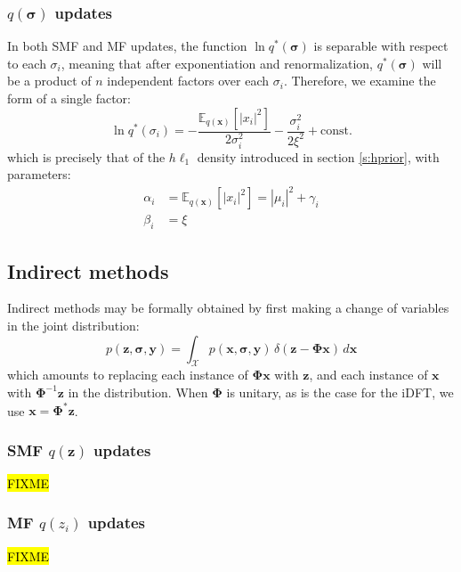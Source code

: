 \documentclass{article}
\newcommand{\m}[1]{\boldsymbol{#1}}
\newcommand{\E}[2]{\mathbb{E}_{#2}\left[ #1 \right]}
\begin{document}
\subsubsection{$q(\m{\sigma})$ updates}
In both SMF and MF updates, the function $\ln q^*(\m{\sigma})$ is separable
with respect to each $\sigma_i$, meaning that after exponentiation and
renormalization, $q^*(\m{\sigma})$ will be a product of $n$ independent
factors over each $\sigma_i$. Therefore, we examine the form of a
single factor:
\begin{equation*}
\ln q^*(\sigma_i) =
 -\frac{\E{|x_i|^2}{q(\m{x})}}{2 \sigma_i^2}
 -\frac{\sigma_i^2}{2 \xi^2}
 +\text{const.}
\end{equation*}
which is precisely that of the $h\ell_1$ density introduced in section
\ref{s:hprior}, with parameters:
\begin{equation*}
\begin{aligned}
\alpha_i &= \E{|x_i|^2}{q(\m{x})} = |\mu_i|^2 + \gamma_i
\\
\beta_i &= \xi
\end{aligned}
\end{equation*}

\subsection{Indirect methods}
\label{ss:var_indirect}
Indirect methods may be formally obtained by first making a change of
variables in the joint distribution:
\begin{equation}
p(\m{z}, \m{\sigma}, \m{y}) = \int_{\mathcal{X}}
 p(\m{x}, \m{\sigma}, \m{y}) \, \delta(\m{z} - \m{\Phi} \m{x}) \, d\m{x}
\label{eq:x_to_z}
\end{equation}
which amounts to replacing each instance of $\m{\Phi} \m{x}$ with $\m{z}$,
and each instance of $\m{x}$ with $\m{\Phi}^{-1} \m{z}$ in the distribution.
When $\m{\Phi}$ is unitary, as is the case for the iDFT, we use
$\m{x} = \m{\Phi}^* \m{z}$.

\subsubsection{SMF $q(\m{z})$ updates}
\hl{FIXME}

\subsubsection{MF $q(z_i)$ updates}
\hl{FIXME}
\end{document}
